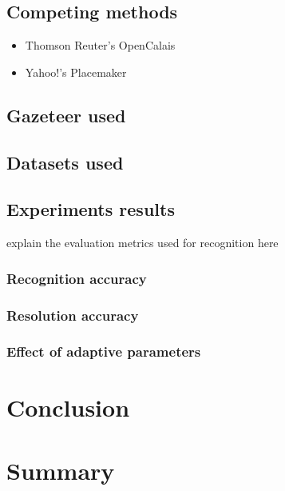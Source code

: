 \documentclass[
     11pt,         %
     a4paper,      %
     oneside,
     ]{article}
\begin{document}
\subsection{Competing methods}
\begin{itemize}
	\item Thomson Reuter's OpenCalais
	\item Yahoo!'s Placemaker
\end{itemize}
\subsection{Gazeteer used}
\subsection{Datasets used}
\subsection{Experiments results}
explain the evaluation metrics used for recognition here
\subsubsection{Recognition accuracy}
\subsubsection{Resolution accuracy}
\subsubsection{Effect of adaptive parameters}
\section{Conclusion}\label{sec:conclusion}

\section{Summary}

\newpage
{}


\end{document}
